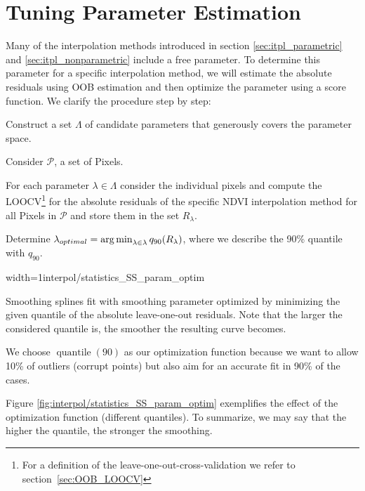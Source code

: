 \section{Tuning Parameter Estimation}{ \label{sec:itpl_param_est}
	Many of the interpolation methods introduced in section \ref{sec:itpl_parametric} and \ref{sec:itpl_nonparametric} include a free parameter. To determine this parameter for a specific interpolation method, we will estimate the absolute residuals using OOB estimation and then optimize the parameter using a score function. We clarify the procedure step by step:	
	\begin{Nenumerate}
		\item Construct a set $\Lambda$ of candidate parameters that generously covers the parameter space.
		\item Consider $\mathcal{P}$, a set of Pixels.
		\item For each parameter $\lambda \in \Lambda$ consider the individual pixels and compute the LOOCV\footnote{For a definition of the leave-one-out-cross-validation we refer to section~\ref{sec:OOB_LOOCV}} for the absolute residuals of the specific NDVI interpolation method for all Pixels in $\mathcal{P}$ and store them in the set $R_\lambda$. 
		\item Determine $\lambda_{optimal} = \operatorname*{arg\, min}_{\lambda\in\lambda}q_{90}(R_\lambda)$, where we describe the 90\% quantile with $q_{90}$.
	\end{Nenumerate}

	\begin{my_figure}[h]{width=1\textwidth}{interpol/statistics_SS_param_optim}
		\caption{Smoothing splines fit with smoothing parameter optimized by minimizing the given quantile of the absolute leave-one-out residuals. Note that the larger the considered quantile is, the smoother the resulting curve becomes.}
		\label{fig:interpol/statistics_SS_param_optim}
	\end{my_figure}

	We choose $\operatorname{quantile}(90)$ as our optimization function because we want to allow 10\% of outliers (corrupt points) but also aim for an accurate fit in 90\% of the cases.  
	
	Figure \ref{fig:interpol/statistics_SS_param_optim} exemplifies the effect of the optimization function (different quantiles). To summarize, we may say that the higher the quantile, the stronger the smoothing. 
}


